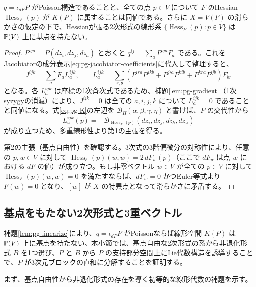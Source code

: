 \begin{lemma}\label{lem:pg-linearize}
$q=\iota_{dF}P$ がPoisson構造であることと、全ての点 $p\in V$ について $F$ のHessian $\operatorname{Hess}_F(p)$ が $K(P)$ に属することは同値である。さらに $X=V(F)$ の滑らかさの仮定の下で、Hessianが張る2次形式の線形系 $\{\operatorname{Hess}_F(p):p\in V\}$ は $\mathbb P(V)$ 上に基点を持たない。
\end{lemma}
\begin{proof}
$P^{ija}=P(dz_i,dz_j,dz_a)$ とおくと $q^{ij}=\sum_a P^{ija}F_a$ である。これをJacobiatorの成分表示\eqref{eq:pg-jacobiator-coefficients}に代入して整理すると、
\begin{equation}
J^{ijk}=\sum_a F_a L_a^{ijk},\qquad
L_a^{ijk}=\sum_{r,b}(P^{ira}P^{jkb}+P^{jra}P^{kib}+P^{kra}P^{ijb})F_{br}
\end{equation}
となる。各 $L_a^{ijk}$ は座標の1次斉次式であるため、補題\ref{lem:pg-gradient}（1次syzygyの消滅）により、$J^{ijk}=0$ は全ての $a,i,j,k$ について $L_a^{ijk}=0$ であることと同値になる。式\eqref{eq:pg-K}の左辺を $\mathcal B_H(\alpha,\beta,\gamma,\eta)$ と書けば、$P$ の交代性から
\begin{equation}
L_a^{ijk}(p)=-\mathcal B_{\operatorname{Hess}_F(p)}(dz_i,dz_j,dz_k,dz_a)
\end{equation}
が成り立つため、多重線形性より第1の主張を得る。

第2の主張（基点自由性）を確認する。3次式の3階偏微分の対称性により、任意の $p,w\in V$ に対して $\operatorname{Hess}_F(p)(w,w)=2\,dF_w(p)$（ここで $dF_w$ は点 $w$ における $dF$ の値）が成り立つ。もし非零ベクトル $w\in V$ が全ての $p\in V$ に対して $\operatorname{Hess}_F(p)(w,w)=0$ を満たすならば、$dF_w=0$ かつEuler等式より $F(w)=0$ となり、$[w]$ が $X$ の特異点となって滑らかさに矛盾する。
\end{proof}

\subsection{基点をもたない2次形式と3重ベクトル}
補題\ref{lem:pg-linearize}により、$q=\iota_{dF}P$ がPoissonならば線形空間 $K(P)$ は $\mathbb P(V)$ 上に基点を持たない。本小節では、基点自由な2次形式の系から非退化形式 $B$ を1つ選び、$P$ と $B$ から $P$ の支持部分空間上にLie代数構造を誘導することで、$P$ が3次元ブロックの直和に分解することを証明する。

まず、基点自由性から非退化形式の存在を導く初等的な線形代数の補題を示す。

